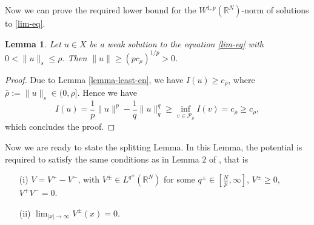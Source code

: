 \documentclass[11pt,reqno]{amsart}
\newtheorem{lemma}[theorem]{Lemma}
\theoremstyle{definition}
\numberwithin{equation}{section}
\numberwithin{theorem}{section}
\numberwithin{equation}{section}
\numberwithin{theorem}{section}
\newcommand{\rn}{\mathbb{R}^N}
\newcommand{\R}{\mathbb{R}}
\newcommand{\raj}[1]{{\textcolor{magenta}{#1}}} %
\begin{document}
Now we can prove the required lower bound for the $W^{1,p}(\R^N)$-norm of solutions to \eqref{lim-eq}.
\begin{lemma}\label{lemma-lower-bd}
Let $u\in X$ be a weak solution to the equation \eqref{lim-eq} with $0<\|u\|_s\le \rho$. Then $\|u\|\ge (pc_\rho)^{1/p}>0$.
\end{lemma}
\begin{proof}
Due to Lemma \ref{lemma-least-en}, we have $I(u)\ge c_{\bar{\rho}}$, where $\bar{\rho}:=\|u\|_s\in(0,\rho]$.
Hence we have
$$I(u)=\frac{1}{p}\|u\|^p-\frac{1}{q}\|u\|^q_q\ge \inf_{v\in\mathcal{P}_{\bar{\rho}}}I(v)=c_{\bar{\rho}}\ge c_\rho,$$
which concludes the proof.
\end{proof}
Now we are ready to state the splitting Lemma. In this Lemma, the potential is required to satisfy the same conditions as in Lemma $2$ of \cite{dhara2025normalised}, that is
\begin{itemize}
  \item[(i)] $V=V^+-V^-$, with $V^\pm\in L^{q^\pm}(\rn)$ for some $q^\pm\in\left[\frac{N}{p},\infty\right]$, $V^\pm\ge 0$, $V^+ V^-=0$.\label{V3}
 \color{black}\item[(ii)] $\lim_{|x|\to\infty}V^\pm(x)=0$.\label{V5}
\end{itemize}
\end{document}
